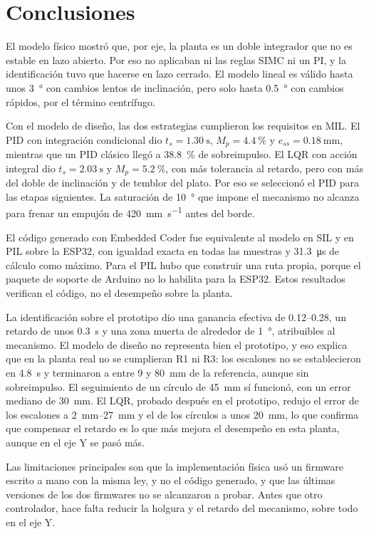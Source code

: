 \section{Conclusiones}

El modelo físico mostró que, por eje, la planta es un doble integrador que no es estable en lazo
abierto. Por eso no aplicaban ni las reglas SIMC ni un PI, y la identificación tuvo que hacerse en
lazo cerrado. El modelo lineal es válido hasta unos \SI{3}{\degree} con cambios lentos de
inclinación, pero solo hasta \SI{0.5}{\degree} con cambios rápidos, por el término centrífugo.

Con el modelo de diseño, las dos estrategias cumplieron los requisitos en MIL. El PID con
integración condicional dio $t_s = \SI{1.30}{\second}$, $M_p = \SI{4.4}{\percent}$ y
$e_{ss} = \SI{0.18}{\milli\metre}$, mientras que un PID clásico llegó a \SI{38.8}{\percent} de
sobreimpulso. El LQR con acción integral dio $t_s = \SI{2.03}{\second}$ y $M_p =
\SI{5.2}{\percent}$, con más tolerancia al retardo, pero con más del doble de inclinación y de
temblor del plato. Por eso se seleccionó el PID para las etapas siguientes. La saturación de
\SI{10}{\degree} que impone el mecanismo no alcanza para frenar un empujón de
\SI{420}{\milli\metre\per\second} antes del borde.

El código generado con Embedded Coder fue equivalente al modelo en SIL y en PIL sobre la ESP32,
con igualdad exacta en todas las muestras y \SI{31.3}{\micro\second} de cálculo como máximo. Para
el PIL hubo que construir una ruta propia, porque el paquete de soporte de Arduino no lo habilita
para la ESP32. Estos resultados verifican el código, no el desempeño sobre la planta.

La identificación sobre el prototipo dio una ganancia efectiva de \numrange{0.12}{0.28}, un
retardo de unos \SI{0.3}{\second} y una zona muerta de alrededor de \SI{1}{\degree}, atribuibles
al mecanismo. El modelo de diseño no representa bien el prototipo, y eso explica que en la planta
real no se cumplieran R1 ni R3: los escalones no se establecieron en \SI{4.8}{\second} y
terminaron a entre \SI{9}{} y \SI{80}{\milli\metre} de la referencia, aunque sin sobreimpulso. El
seguimiento de un círculo de \SI{45}{\milli\metre} sí funcionó, con un error mediano de
\SI{30}{\milli\metre}. El LQR, probado después en el prototipo, redujo el error de los escalones a
\SIrange{2}{27}{\milli\metre} y el de los círculos a unos \SI{20}{\milli\metre}, lo que confirma
que compensar el retardo es lo que más mejora el desempeño en esta planta, aunque en el eje Y se
pasó más.

Las limitaciones principales son que la implementación física usó un firmware escrito a mano
con la misma ley, y no el código generado, y que las últimas versiones de los dos firmwares no
se alcanzaron a probar. Antes que otro controlador, hace falta reducir la holgura y el retardo
del mecanismo, sobre todo en el eje Y.
